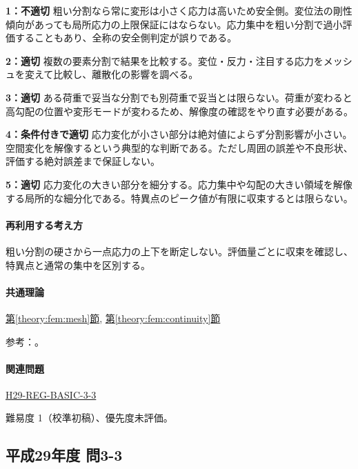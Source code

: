 \noindent\textbf{1：不適切} 粗い分割なら常に変形は小さく応力は高いため安全側。変位法の剛性傾向があっても局所応力の上限保証にはならない。応力集中を粗い分割で過小評価することもあり、全称の安全側判定が誤りである。\par

\noindent\textbf{2：適切} 複数の要素分割で結果を比較する。変位・反力・注目する応力をメッシュを変えて比較し、離散化の影響を調べる。\par

\noindent\textbf{3：適切} ある荷重で妥当な分割でも別荷重で妥当とは限らない。荷重が変わると高勾配の位置や変形モードが変わるため、解像度の確認をやり直す必要がある。\par

\noindent\textbf{4：条件付きで適切} 応力変化が小さい部分は絶対値によらず分割影響が小さい。空間変化を解像するという典型的な判断である。ただし周囲の誤差や不良形状、評価する絶対誤差まで保証しない。\par

\noindent\textbf{5：適切} 応力変化の大きい部分を細分する。応力集中や勾配の大きい領域を解像する局所的な細分化である。特異点のピーク値が有限に収束するとは限らない。\par

\paragraph{再利用する考え方} 粗い分割の硬さから一点応力の上下を断定しない。評価量ごとに収束を確認し、特異点と通常の集中を区別する。

\paragraph{共通理論} \hyperref[theory:fem:mesh]{第\ref*{theory:fem:mesh}節}, \hyperref[theory:fem:continuity]{第\ref*{theory:fem:continuity}節}

\par 参考：\cite{mit_roy_fea1999}。

\paragraph{関連問題} \hyperref[q:h29-reg-basic-3-3]{H29-REG-BASIC-3-3}

\par 難易度 1（校準初稿）、優先度未評価。

\subsection{平成29年度 問3-3}
\label{q:h29-reg-basic-3-3}

